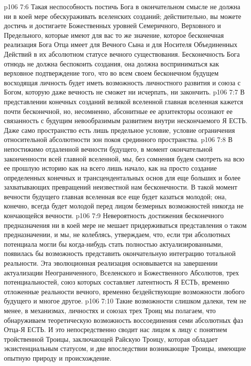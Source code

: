 \vs p106 7:6 Такая неспособность постичь Бога в окончательном смысле не должна ни в коей мере обескураживать вселенских созданий; действительно, вы можете достичь и достигаете Божественных уровней Семеричного, Верховного и Предельного, которые имеют для вас то же значение, которое бесконечная реализация Бога Отца имеет для Вечного Сына и для Носителя Объединенных Действий в их абсолютном статусе вечного существования. Бесконечность Бога отнюдь не должна беспокоить создания, она должна восприниматься как верховное подтверждение того, что во всем своем бесконечном будущем восходящая личность будет иметь возможность личностного развития и союза с Богом, которую даже вечность не сможет ни исчерпать, ни закончить.
\vs p106 7:7 \pc В представлении конечных созданий великой вселенной главная вселенная кажется почти бесконечной, но, несомненно, абсонитные ее архитекторы осознают ее связанность с будущим невообразимым развитием внутри нескончаемого Я ЕСТЬ. Даже само пространство есть лишь предельное условие, условие ограничения  относительной абсолютности зон покоя срединного пространства.
\vs p106 7:8 В непостижимо отдаленной вечности будущего, в момент окончательной законченности всей главной вселенной, мы, без сомнения будем смотреть на всю ее прошлую историю как на всего лишь начало, как на просто создание определенных конечных и трансцендентальных основ для еще больших и более захватывающих превращений неизвестной нам бесконечности. В такой момент вечности будущего главная вселенная все еще будет казаться молодой; она, конечно, всегда будет молодой перед лицом безмерных возможностей никогда не кончающейся вечности.
\vs p106 7:9 \pc Невероятность достижения бесконечного предназначения ни в коей мере не мешает придерживаться представления о таком предназначении, и мы, не колеблясь, утверждаем, что, если три абсолютных потенциала могли бы когда\hyp{}нибудь стать полностью актуализированными, появилась бы возможность представить окончательную интеграцию тотальной реальности. Эта эволюционная реализация основывается на завершении актуализации Неограниченного, Вселенского и Божественного Абсолютов, трех потенциальностей, союз которых составляет латентность Я ЕСТЬ, временно отложенные реальности вечного, временно бездействующие возможности любого будущего и многое другое.
\vs p106 7:10 Такие возможности слишком далеки, тем не менее, в механизмах, личностях и союзах трех Троиц мы полагаем, что обнаруживаем теоретическую возможность воссоединения семи абсолютных фаз Отца\hyp{}Я ЕСТЬ. И это непосредственно сводит нас лицом к лицу с понятием тройственной Троицы, заключающей Райскую Троицу, которая обладает экзистенциальным статусом, и две впоследствии возникающие Троицы, имеющие опытную природу и происхождение.
